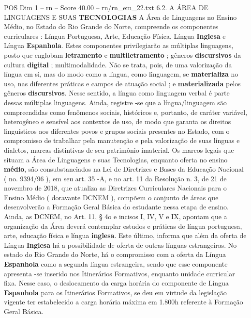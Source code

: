 \begin{textsample}{POS Dim 1 – rn – Score 40.00 – rn/rn\_em\_22.txt}  \label{ex:f1_pos_266}
6.2.
A ÁREA DE LINGUAGENS E SUAS \textbf{TECNOLOGIAS} A Área de Linguagens no Ensino Médio, no Estado do Rio Grande do Norte, compreende os componentes curriculares : Língua Portuguesa, Arte, Educação Física, Língua \textbf{Inglesa} e Língua \textbf{Espanhola}.
Estes componentes privilegiarão as múltiplas linguagens, posto que englobam \textbf{letramento} e \textbf{multiletramento} ; gêneros \textbf{discursivos} da cultura \textbf{digital} ; multimodalidade.
Não se trata, pois, de uma valorização da língua em si, mas do modo como a língua, como linguagem, se \textbf{materializa} no uso, nas diferentes práticas e campos de atuação social ; e \textbf{materializada} pelos gêneros \textbf{discursivos}.
Nesse sentido, a língua como linguagem verbal é parte dessas múltiplas linguagens.
Ainda, registre -se que a língua/linguagem são compreendidas como fenômenos sociais, históricos e, portanto, de caráter variável, heterogêneo e sensível aos contextos de uso, de modo que garanta os direitos linguísticos aos diferentes povos e grupos sociais presentes no Estado, com o compromisso de trabalhar pela manutenção e pela valorização de suas línguas e dialetos, marcas distintivas de seu patrimônio imaterial.
Os marcos legais que situam a Área de Linguagens e suas Tecnologias, enquanto oferta no ensino \textbf{médio}, são consubstanciados na Lei de Diretrizes e Bases da Educação Nacional ( no. 9394/96 ), em seu art. 35 -A, e no art. 11 da Resolução n. 3, de 21 de novembro de 2018, que atualiza as Diretrizes Curriculares Nacionais para o Ensino Médio ( doravante DCNEM ), compõem o conjunto de áreas que desenvolverão a Formação Geral Básica do estudante nessa etapa de ensino.
Ainda, as DCNEM, no Art. 11, § 4o e incisos I, IV, V e IX, apontam que a organização da Área deverá contemplar estudos e práticas de língua portuguesa, arte, educação física e língua \textbf{inglesa}.
Este último, informa que além da oferta de Língua \textbf{Inglesa} há a possibilidade de oferta de outras línguas estrangeiras.
No estado do Rio Grande do Norte, há o compromisso com a oferta da Língua \textbf{Espanhola} como a segunda língua estrangeira, sendo que esse componente apresenta -se inserido nos Itinerários Formativos, enquanto unidade curricular fixa.
Nesse caso, o deslocamento da carga horária do componente de Língua \textbf{Espanhola} para os Itinerários Formativos, se deu em virtude da legislação vigente ter estabelecido a carga horária máxima em 1.800h referente à Formação Geral Básica.

\end{textsample}
